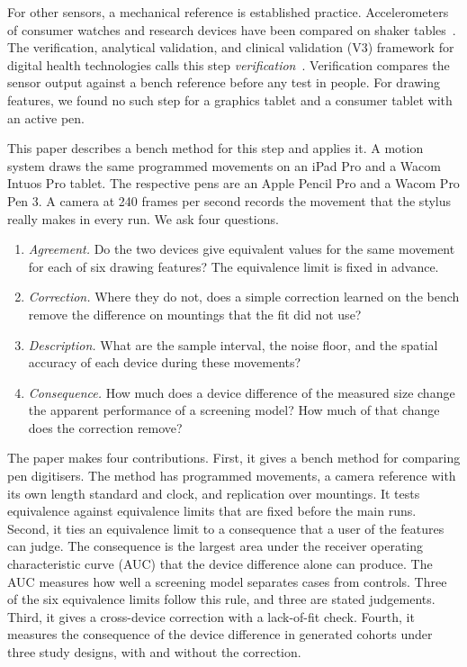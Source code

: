 For other sensors, a mechanical reference is established practice.
Accelerometers of consumer watches and research devices have been compared on shaker tables~\cite{White2024,Lamunion2025}.
The verification, analytical validation, and clinical validation (V3) framework for digital health technologies calls this step \emph{verification}~\cite{Goldsack2020}.
Verification compares the sensor output against a bench reference before any test in people.
For drawing features, we found no such step for a graphics tablet and a consumer tablet with an active pen.

This paper describes a bench method for this step and applies it.
A motion system draws the same programmed movements on an iPad Pro and a Wacom Intuos Pro tablet.
The respective pens are an Apple Pencil Pro and a Wacom Pro Pen 3.
A camera at 240 frames per second records the movement that the stylus really makes in every run.
We ask four questions.
\begin{enumerate}
\item \emph{Agreement.} Do the two devices give equivalent values for the same movement for each of six drawing features?
The equivalence limit is fixed in advance.
\item \emph{Correction.} Where they do not, does a simple correction learned on the bench remove the difference on mountings that the fit did not use?
\item \emph{Description.} What are the sample interval, the noise floor, and the spatial accuracy of each device during these movements?
\item \emph{Consequence.} How much does a device difference of the measured size change the apparent performance of a screening model?
How much of that change does the correction remove?
\end{enumerate}

The paper makes four contributions.
First, it gives a bench method for comparing pen digitisers.
The method has programmed movements, a camera reference with its own length standard and clock, and replication over mountings.
It tests equivalence against equivalence limits that are fixed before the main runs.
Second, it ties an equivalence limit to a consequence that a user of the features can judge.
The consequence is the largest area under the receiver operating characteristic curve (AUC) that the device difference alone can produce.
The AUC measures how well a screening model separates cases from controls.
Three of the six equivalence limits follow this rule, and three are stated judgements.
Third, it gives a cross-device correction with a lack-of-fit check.
Fourth, it measures the consequence of the device difference in generated cohorts under three study designs, with and without the correction.

